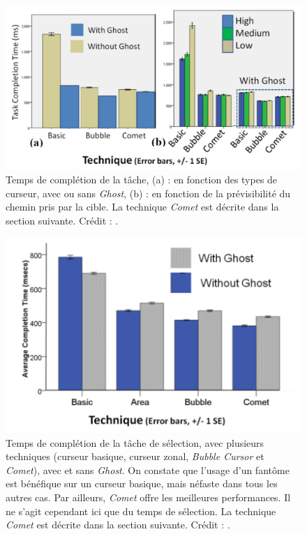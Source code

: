 	\begin{figure}[H]
		\centering
		\includegraphics[width=\textwidth]{figures/ch2/cometGhostPredictability}
		\caption[\emph{Comet/Ghost}, prévisibilité et résultats]{Temps de complétion de la tâche, (a) : en fonction des types de curseur, avec ou sans \emph{Ghost}, (b) : en fonction de la prévisibilité du chemin pris par la cible. La technique \emph{Comet} est décrite dans la section suivante. Crédit : \cite{hasan2011comet}.}
		\label{fig:cometGhostPredictability}
	\end{figure}
	
		\begin{figure}[H]
		\centering
		\includegraphics[width=\textwidth]{figures/ch2/cometGhostTimes}
		\caption[\emph{Comet/Ghost}, temps de sélection]{Temps de complétion de la tâche de sélection, avec plusieurs techniques (curseur basique, curseur zonal, \emph{Bubble Cursor} et \emph{Comet}), avec et sans \emph{Ghost}. On constate que l'usage d'un fantôme est bénéfique sur un curseur basique, mais néfaste dans tous les autres cas. Par ailleurs, \emph{Comet} offre les meilleures performances. Il ne s'agit cependant ici que du temps de sélection. La technique \emph{Comet} est décrite dans la section suivante. Crédit : \cite{hasan2011comet}.}
		\label{fig:cometGhostTimes}
	\end{figure}
	
